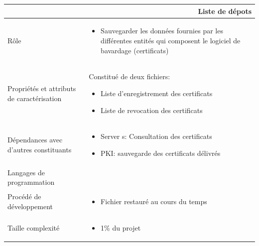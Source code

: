 \documentclass[a4paper,11pt,french]{article}
\begin{document}
\begin{center}
	\vspace*{0.7cm}
	\begin{tabularx}{16cm}{|l|X|}
	\hline
	\multicolumn{2}{|r|}{\textbf{Liste de dépots}}\\
	\hline
	R\^ole &  \begin{itemize}\item Sauvegarder les données fournies par les différentes entités qui composent le logiciel de bavardage (certificats) \end{itemize}\\
	\hline
	Propriétés et attributs de caractérisation & Constitué de deux fichiers:\begin{itemize}\item Liste d'enregistrement des certificats \item Liste de revocation des certificats \end{itemize} \\
	\hline
	Dépendances avec d'autres constituants & \begin{itemize}\item Server s: Consultation des certificats \item PKI: sauvegarde des certificats délivrés
 \end{itemize} \\
	\hline
	Langages de programmation & \\
	\hline
	Procédé de développement & \begin{itemize}\item Fichier restauré au cours du temps \end{itemize}\\
	\hline
	Taille complexité & \begin{itemize}\item 1\% du projet \end{itemize}\\
	\hline
	\end{tabularx}
\end{center}
\end{document}
